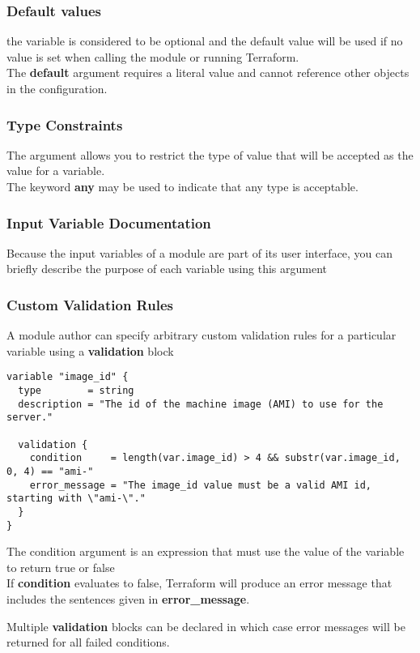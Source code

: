 \documentclass[12pt, letterpaper, twoside]{article}
\begin{document}
\subsubsection{Default values}
the variable is considered to be optional and the default value will be used if no value is set 
when calling the module or running Terraform.\\
The \textbf{default} argument requires a literal value and cannot reference other objects 
in the configuration.

\subsubsection{Type Constraints}
The argument allows you to restrict the type of value that will be accepted as the value for 
a variable.\\
The keyword \textbf{any} may be used to indicate that any type is acceptable.

\subsubsection{Input Variable Documentation}
Because the input variables of a module are part of its user interface, you can briefly describe 
the purpose of each variable using this argument

\subsubsection{Custom Validation Rules}
A module author can specify arbitrary custom validation rules for a particular variable using a 
\textbf{validation} block
\begin{verbatim}
variable "image_id" {
  type        = string
  description = "The id of the machine image (AMI) to use for the server."

  validation {
    condition     = length(var.image_id) > 4 && substr(var.image_id, 0, 4) == "ami-"
    error_message = "The image_id value must be a valid AMI id, starting with \"ami-\"."
  }
}
\end{verbatim}
The condition argument is an expression that must use the value of the variable to return 
true or false\\
If \textbf{condition} evaluates to false, Terraform will produce an error message that includes the 
sentences given in \textbf{error\_message}.

Multiple \textbf{validation} blocks can be declared in which case error messages will be returned 
for all failed conditions.
\end{document}

